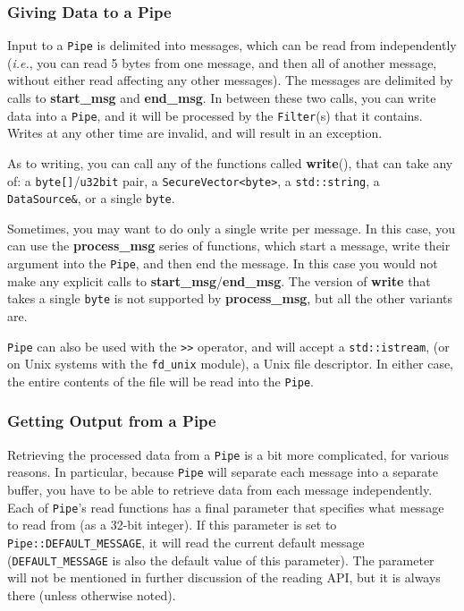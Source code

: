 \documentclass{article}
\newcommand{\function}[1]{\textbf{#1}}
\newcommand{\type}[1]{\texttt{#1}}
\newcommand{\ie}[0]{\emph{i.e.}}
\begin{document}
\subsubsection{Giving Data to a Pipe}

Input to a \type{Pipe} is delimited into messages, which can be read from
independently (\ie, you can read 5 bytes from one message, and then all of
another message, without either read affecting any other messages). The
messages are delimited by calls to \function{start\_msg} and
\function{end\_msg}. In between these two calls, you can write data into a
\type{Pipe}, and it will be processed by the \type{Filter}(s) that it
contains. Writes at any other time are invalid, and will result in an
exception.

As to writing, you can call any of the functions called \function{write}(),
that can take any of: a \type{byte[]}/\type{u32bit} pair, a
\type{SecureVector<byte>}, a \type{std::string}, a \type{DataSource\&}, or a
single \type{byte}.

Sometimes, you may want to do only a single write per message. In this case,
you can use the \function{process\_msg} series of functions, which start a
message, write their argument into the \type{Pipe}, and then end the
message. In this case you would not make any explicit calls to
\function{start\_msg}/\function{end\_msg}. The version of \function{write}
that takes a single \type{byte} is not supported by \function{process\_msg},
but all the other variants are.

\type{Pipe} can also be used with the \verb|>>| operator, and will accept a
\type{std::istream}, (or on Unix systems with the \verb|fd_unix| module), a
Unix file descriptor. In either case, the entire contents of the file will be
read into the \type{Pipe}.

\subsubsection{Getting Output from a Pipe}

Retrieving the processed data from a \type{Pipe} is a bit more complicated, for
various reasons. In particular, because \type{Pipe} will separate each message
into a separate buffer, you have to be able to retrieve data from each message
independently. Each of \type{Pipe}'s read functions has a final parameter that
specifies what message to read from (as a 32-bit integer). If this parameter is
set to \type{Pipe::DEFAULT\_MESSAGE}, it will read the current default message
(\type{DEFAULT\_MESSAGE} is also the default value of this parameter). The
parameter will not be mentioned in further discussion of the reading API, but
it is always there (unless otherwise noted).
\end{document}
